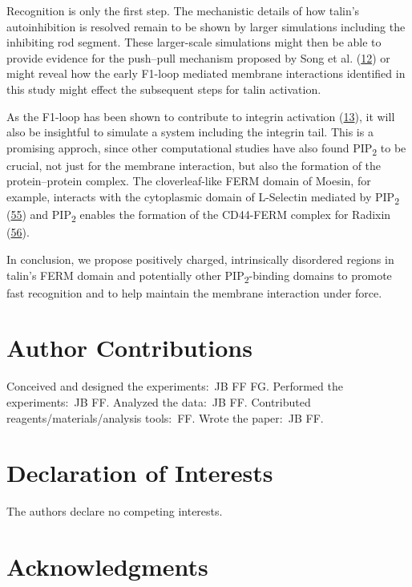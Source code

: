 \documentclass[
  twocolumn]{biophys-new-mod}
\begin{document}
Recognition is only the first step. The mechanistic details of how
talin's autoinhibition is resolved remain to be shown by larger
simulations including the inhibiting rod segment. These larger-scale
simulations might then be able to provide evidence for the push--pull
mechanism proposed by Song et al.
(\protect\hyperlink{ref-songNovelMembranedependentSwitch2012a}{12}) or
might reveal how the early F1-loop mediated membrane interactions
identified in this study might effect the subsequent steps for talin
activation.

As the F1-loop has been shown to contribute to integrin activation
(\protect\hyperlink{ref-goultStructureDoubleUbiquitinlike2010}{13}), it
will also be insightful to simulate a system including the integrin
tail. This is a promising approch, since other computational studies
have also found PIP\textsubscript{2} to be crucial, not just for the
membrane interaction, but also the formation of the protein--protein
complex. The cloverleaf-like FERM domain of Moesin, for example,
interacts with the cytoplasmic domain of L-Selectin mediated by
PIP\textsubscript{2}
(\protect\hyperlink{ref-sunMolecularDynamicsAssociation2018}{55}) and
PIP\textsubscript{2} enables the formation of the CD44-FERM complex for
Radixin
(\protect\hyperlink{ref-sunMolecularMechanismBidirectional2020}{56}).

In conclusion, we propose positively charged, intrinsically disordered
regions in talin's FERM domain and potentially other
PIP\textsubscript{2}-binding domains to promote fast recognition and to
help maintain the membrane interaction under force.

\hypertarget{author-contributions}{%
\section{Author Contributions}\label{author-contributions}}

Conceived and designed the experiments:~JB FF FG. Performed the
experiments:~JB FF. Analyzed the data:~JB FF. Contributed
reagents/materials/analysis tools:~FF. Wrote the paper:~JB FF.

\hypertarget{declaration-of-interests}{%
\section{Declaration of Interests}\label{declaration-of-interests}}

The authors declare no competing interests.

\hypertarget{acknowledgments}{%
\section{Acknowledgments}\label{acknowledgments}}
\end{document}
